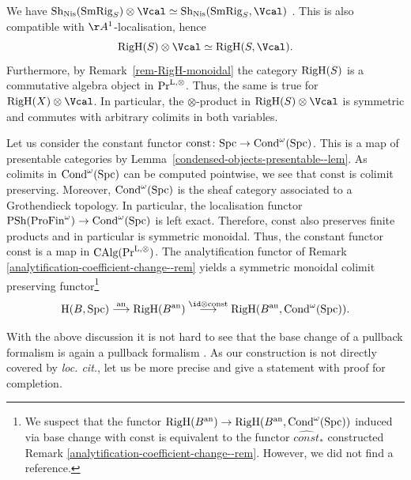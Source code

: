 \documentclass[colorinlistoftodos,article,11pt,reqno]{article}
\newcommand{\RigH}{\textup{RigH}}
\newcommand{\SmRig}{\textup{SmRig}}
\newcommand{\Cond}{\textup{Cond}}
\newcommand{\Spc}{\textup{Spc}}
\newcommand{\PSh}{\textup{PSh}}
\newcommand{\Sh}{\textup{Sh}}
\newcommand{\ProFin}{\textup{ProFin}}
\newcommand{\Nis}{\textup{Nis}}
\newcommand{\an}{\textup{an}}
\newcommand{\Arig}{\AA^{1}}
\renewcommand{\to}[1][]{\overset{#1}{\rightarrow}}
\newcommand{\To}[1][]{\overset{#1}{\longrightarrow}}
\newcommand{\PrLO}{\textup{Pr}^{\textup{L},\otimes}}
\newcommand{\CAlgPr}{\textup{CAlg}(\PrLO)}
\begin{document}
\begin{rem}
\label{rem-change-of-coeff}
	We have $\Sh_{\Nis}(\SmRig_{S})\otimes\Vcal\simeq \Sh_{\Nis}(\SmRig_{S},\Vcal)$ \cite[Prop. 2.4]{DrewMHM}. This is also compatible with $\Arig$-localisation, hence
	\[
        \RigH(S)\otimes\Vcal\simeq\RigH(S,\Vcal).
	\]
    Furthermore, by Remark~\ref{rem-RigH-monoidal} the category $\RigH(S)$ is a commutative algebra object in $\PrLO$. Thus, the same is true for $\RigH(X)\otimes\Vcal$. In particular, the $\otimes$-product in $\RigH(S)\otimes\Vcal$ is symmetric and commutes with arbitrary colimits in both variables.
\end{rem}

\begin{rem}
\label{rem-analyitification-monoidal}
    Let us consider the constant functor $\mathrm{const}\colon \Spc\to\Cond^{\omega}(\Spc)$. This is a map of presentable categories by Lemma~\ref{condensed-objects-presentable--lem}. As colimits in $\Cond^{\omega}(\Spc)$ can be computed pointwise, we see that $\mathrm{const}$ is colimit preserving. Moreover, $\Cond^{\omega}(\Spc)$ is the sheaf category associated to a Grothendieck topology. In particular, the localisation functor $\PSh(\ProFin^{\omega})\rightarrow \Cond^{\omega}(\Spc)$ is left exact. Therefore, $\mathrm{const}$ also preserves finite products and in particular is symmetric monoidal. Thus, the constant functor $\mathrm{const}$ is a map in $\CAlgPr$. The analytification functor of Remark~ \ref{analytification-coefficient-change--rem} yields a symmetric monoidal colimit preserving functor\footnote{We suspect that the functor $\RigH(B^{\an})\rightarrow \RigH(B^{\an},\Cond^{\omega}(\Spc))$ induced via base change with $\mathrm{const}$ is equivalent to the functor $\widehat{const}_*$ constructed Remark \ref{analytification-coefficient-change--rem}. However, we did not find a reference.} 
    $$
        \textup{H}(B,\Spc)\To[\textup{an}] \RigH(B^{\an})\To[\id\otimes\mathrm{const}] \RigH(B^{\an},\Cond^{\omega}(\Spc)).
    $$
\end{rem}

With the above discussion it is not hard to see that the base change of a pullback formalism is again a pullback formalism \cite[\S 8]{DrewMHM}. As our construction is not directly covered by \textit{loc.\!\! cit.}, let us be more precise and give a statement with proof for completion.
\end{document}

